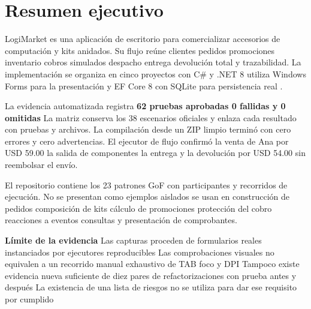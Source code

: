
\section{Resumen ejecutivo}
LogiMarket es una aplicación de escritorio para comercializar accesorios de computación y kits anidados. Su flujo reúne clientes pedidos promociones inventario cobros simulados despacho entrega devolución total y trazabilidad. La implementación se organiza en cinco proyectos con C\# y .NET 8 utiliza Windows Forms para la presentación y EF Core 8 con SQLite para persistencia real \cite{guia,repo,winforms}.

La evidencia automatizada registra \textbf{62 pruebas aprobadas 0 fallidas y 0 omitidas} La matriz conserva los 38 escenarios oficiales y enlaza cada resultado con pruebas y archivos. La compilación desde un ZIP limpio terminó con cero errores y cero advertencias. El ejecutor de flujo confirmó la venta de Ana por USD 59.00 la salida de componentes la entrega y la devolución por USD 54.00 sin reembolsar el envío.

El repositorio contiene los 23 patrones GoF con participantes y recorridos de ejecución. No se presentan como ejemplos aislados se usan en construcción de pedidos composición de kits cálculo de promociones protección del cobro reacciones a eventos consultas y presentación de comprobantes.

\textbf{Límite de la evidencia} Las capturas proceden de formularios reales instanciados por ejecutores reproducibles Las comprobaciones visuales no equivalen a un recorrido manual exhaustivo de TAB foco y DPI Tampoco existe evidencia nueva suficiente de diez pares de refactorizaciones con prueba antes y después La existencia de una lista de riesgos no se utiliza para dar ese requisito por cumplido
